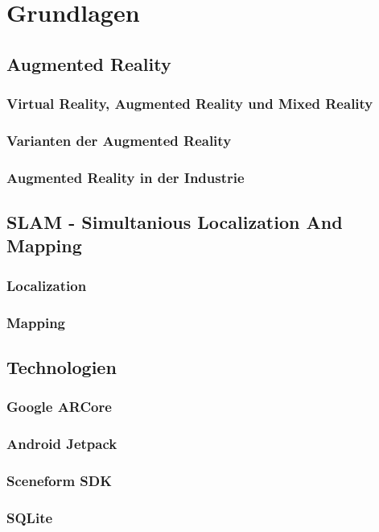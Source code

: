 
\chapter{Grundlagen}
\section{Augmented Reality}
\subsection{Virtual Reality, Augmented Reality und Mixed Reality}
\subsection{Varianten der Augmented Reality}
\subsection{Augmented Reality in der Industrie}

\section{SLAM - Simultanious Localization And Mapping}
\subsection{Localization}
\subsection{Mapping}

\section{Technologien}
\subsection{Google ARCore}
\subsection{Android Jetpack}
\subsection{Sceneform SDK}
\subsection{SQLite}

